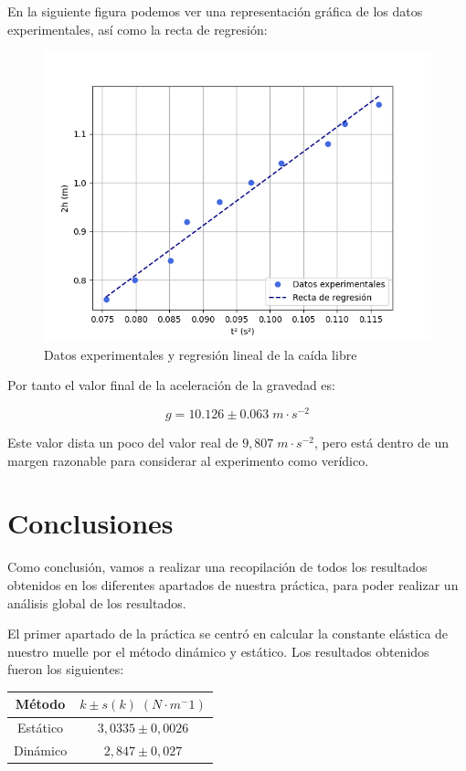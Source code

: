 \documentclass[a4paper,12pt,titlepage]{article}
\begin{document}
En la siguiente figura podemos ver una representación gráfica de los datos experimentales, así como la recta de regresión:

\begin{figure}[h!]
    \centering
    \includegraphics[width=0.75\linewidth]{Images/RegGravedad.png}
    \caption{Datos experimentales y regresión lineal de la caída libre}
\end{figure}

Por tanto el valor final de la aceleración de la gravedad es:

\begin{equation}
    g = 10.126 \pm 0.063 \; m \cdot s^{-2}
\end{equation}

Este valor dista un poco del valor real de $9,807 \; m \cdot s^{-2}$, pero está dentro de un margen razonable para considerar al experimento como verídico.

\section{Conclusiones}

Como conclusión, vamos a realizar una recopilación de todos los resultados obtenidos en los diferentes apartados de nuestra práctica, para poder realizar un análisis global de los resultados.

\par El primer apartado de la práctica se centró en calcular la constante elástica de nuestro muelle por el método dinámico y estático. Los resultados obtenidos fueron los siguientes:

\begin{table}[h!]
    \centering
    \begin{tabular}{|c|c|}
        \hline
        Método & $k \pm s(k) \; (N\cdot m^-1)$ \\ \hline
        Estático & $3,0335  \pm 0,0026$\\ \hline
        Dinámico & $2,847 \pm 0,027$\\ \hline
    \end{tabular}
\end{table}
\end{document}
